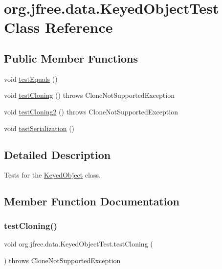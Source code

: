 \hypertarget{classorg_1_1jfree_1_1data_1_1_keyed_object_test}{}\section{org.\+jfree.\+data.\+Keyed\+Object\+Test Class Reference}
\label{classorg_1_1jfree_1_1data_1_1_keyed_object_test}
\subsection*{Public Member Functions}
\begin{DoxyCompactItemize}
\item 
void \mbox{\hyperlink{classorg_1_1jfree_1_1data_1_1_keyed_object_test_aac0a60d4083f0dbec08974d0232f75d9}{test\+Equals}} ()
\item 
void \mbox{\hyperlink{classorg_1_1jfree_1_1data_1_1_keyed_object_test_ad227adc109bc5dee9fee558bbdfe9e64}{test\+Cloning}} ()  throws Clone\+Not\+Supported\+Exception 
\item 
void \mbox{\hyperlink{classorg_1_1jfree_1_1data_1_1_keyed_object_test_a0cce4049e19ceb838644bc4433fbd17a}{test\+Cloning2}} ()  throws Clone\+Not\+Supported\+Exception 
\item 
void \mbox{\hyperlink{classorg_1_1jfree_1_1data_1_1_keyed_object_test_a6a0af5569c18118f9ac49860366a12ca}{test\+Serialization}} ()
\end{DoxyCompactItemize}


\subsection{Detailed Description}
Tests for the \mbox{\hyperlink{classorg_1_1jfree_1_1data_1_1_keyed_object}{Keyed\+Object}} class. 

\subsection{Member Function Documentation}
\mbox{\label{classorg_1_1jfree_1_1data_1_1_keyed_object_test_ad227adc109bc5dee9fee558bbdfe9e64}} 
\subsubsection{\texorpdfstring{test\+Cloning()}{testCloning()}}
{\footnotesize\ttfamily void org.\+jfree.\+data.\+Keyed\+Object\+Test.\+test\+Cloning (\begin{DoxyParamCaption}{ }\end{DoxyParamCaption}) throws Clone\+Not\+Supported\+Exception}

